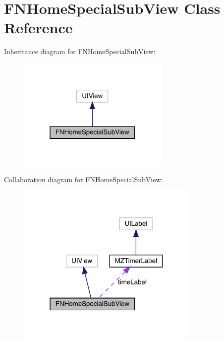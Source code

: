 \hypertarget{interface_f_n_home_special_sub_view}{}\section{F\+N\+Home\+Special\+Sub\+View Class Reference}
\label{interface_f_n_home_special_sub_view}


Inheritance diagram for F\+N\+Home\+Special\+Sub\+View\+:\nopagebreak
\begin{figure}[H]
\begin{center}
\leavevmode
\includegraphics[width=208pt]{interface_f_n_home_special_sub_view__inherit__graph}
\end{center}
\end{figure}


Collaboration diagram for F\+N\+Home\+Special\+Sub\+View\+:\nopagebreak
\begin{figure}[H]
\begin{center}
\leavevmode
\includegraphics[width=250pt]{interface_f_n_home_special_sub_view__coll__graph}
\end{center}
\end{figure}
